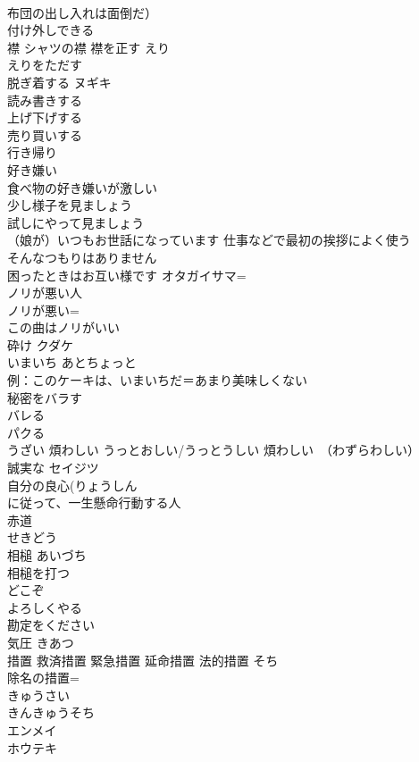 \documentclass[8pt]{extreport}
\begin{document}
\begin{CJK}{UTF8}{min}
\\	布団の出し入れは面倒だ）
\\	付け外しできる	
\\	襟 シャツの襟 襟を正す	えり
\\	えりをただす 
\\	脱ぎ着する	ヌギキ 
\\	読み書きする	
\\	上げ下げする	
\\	売り買いする	
\\	行き帰り	
\\	好き嫌い	
\\	食べ物の好き嫌いが激しい
\\	少し様子を見ましょう	
\\	試しにやって見ましょう	
\\	（娘が）いつもお世話になっています	仕事などで最初の挨拶によく使う 
\\	そんなつもりはありません	
\\	困ったときはお互い様です	オタガイサマ=
\\	ノリが悪い人	
\\	ノリが悪い=
\\	この曲はノリがいい	
\\	砕け	クダケ 
\\	いまいち	あとちょっと 
\\	例：このケーキは、いまいちだ＝あまり美味しくない
\\	秘密をバラす	
\\	バレる 
\\	パクる	
\\	うざい 煩わしい うっとおしい/うっとうしい	煩わしい　（わずらわしい） 
\\	誠実な	セイジツ 
\\	自分の良心(りょうしん 
\\	に従って、一生懸命行動する人
\\	赤道	
\\	せきどう
\\	相槌	あいづち 
\\	相槌を打つ 
\\	どこぞ	
\\	よろしくやる	
\\	勘定をください	
\\	気圧	きあつ 
\\	措置 救済措置 緊急措置 延命措置 法的措置	そち　
\\	除名の措置=
\\	きゅうさい 
\\	きんきゅうそち　
\\	エンメイ
\\	ホウテキ 
\end{CJK}
\end{document}

